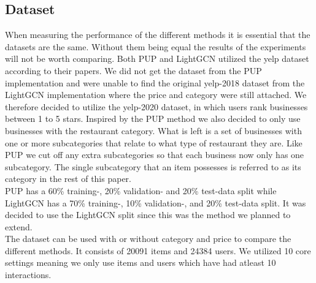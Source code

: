 \subsection{Dataset} \label{equal-data}
When measuring the performance of the different methods it is essential that the datasets are the same.
Without them being equal the results of the experiments will not be worth comparing.
Both PUP and LightGCN utilized the yelp dataset according to their papers.
We did not get the dataset from the PUP implementation and were unable to find the original yelp-2018 dataset from the LightGCN implementation where the price and category were still attached.
We therefore decided to utilize the yelp-2020 dataset, in which users rank businesses between 1 to 5 stars.
Inspired by the PUP method we also decided to only use businesses with the restaurant category.
What is left is a set of businesses with one or more subcategories that relate to what type of restaurant they are.
Like PUP we cut off any extra subcategories so that each business now only has one subcategory.
The single subcategory that an item possesses is referred to as its category in the rest of this paper.
\\
PUP has a 60\% training-, 20\% validation- and 20\% test-data split while LightGCN has a 70\% training-, 10\% validation-, and 20\% test-data split.
It was decided to use the LightGCN split since this was the method we planned to extend.
\\
The dataset can be used with or without category and price to compare the different methods.
It consists of 20091 items and 24384 users.
We utilized 10 core settings meaning we only use items and users which have had atleast 10 interactions.
